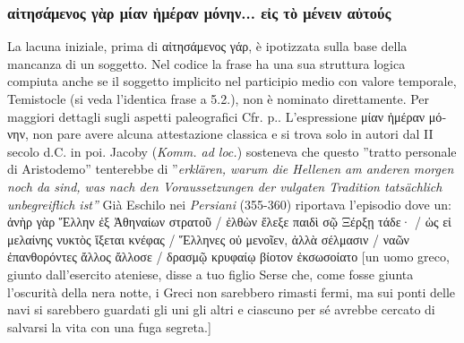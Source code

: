 {\subsubsection{\textgreek{αἰτησάμενος γὰρ μίαν ἡμέραν μόνην... εἰς τὸ μένειν αὐτούς}}\label{bkm:RefHeading696981501267828}
La lacuna iniziale, prima di \textgreek{αἰτησάμενος γάρ}, è ipotizzata sulla base della
mancanza di un soggetto. Nel codice la frase ha
una sua struttura logica compiuta anche se il soggetto implicito nel
participio medio con valore temporale, Temistocle (si veda
l'identica frase a 5.2.), non è
nominato direttamente. Per maggiori dettagli
sugli aspetti paleografici Cfr. p.\pageref{bkm:RefHeading707961501267828}.
L'espressione \textgreek{μίαν ἡμέραν μόνην}, non pare
avere alcuna attestazione classica e si trova solo in autori dal II
secolo d.C. in poi. Jacoby (\emph{Komm. ad loc.}) sosteneva che questo
''tratto personale di Aristodemo'' tenterebbe
di ''\textit{erklären,
warum die Hellenen am anderen morgen noch da
sind, was nach den Voraussetzungen der
vulgaten Tradition tatsächlich
unbegreiflich ist''}
Già Eschilo nei \textit{Persiani} (355-360) riportava l'episodio dove un: \textgreek{ἀνὴρ γὰρ Ἕλλην ἐξ Ἀθηναίων στρατοῦ / ἐλθὼν ἔλεξε παιδὶ σῷ Ξέρξῃ τάδε·  / ὡς εἰ μελαίνης νυκτὸς ἵξεται κνέφας / Ἕλληνες οὐ μενοῖεν, ἀλλὰ σέλμασιν / ναῶν ἐπανθορόντες ἄλλος ἄλλοσε / δρασμῷ κρυφαίῳ βίοτον ἐκσωσοίατο} [un uomo greco, giunto dall'esercito ateniese, disse a tuo figlio Serse che, come fosse giunta l'oscurità della nera notte, i Greci non sarebbero rimasti fermi, ma sui ponti delle navi si sarebbero guardati gli uni gli altri e ciascuno per sé avrebbe cercato di salvarsi la vita con una fuga segreta.] 
}
